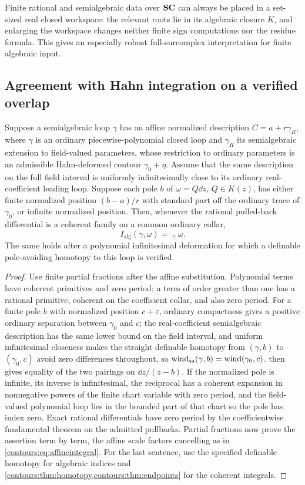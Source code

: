 \documentclass[11pt,letterpaper]{article}
\theoremstyle{definition}
\theoremstyle{remark}
\newcommand{\HInt}{\mathop{\int^{\!H}}\nolimits}
\numberwithin{equation}{section}
\begin{document}
Finite rational and semialgebraic data over $\mathbf{SC}$ can always be placed in a
set-sized real closed workspace: the relevant roots lie in its algebraic closure
$K$, and enlarging the workspace changes neither finite sign computations nor the
residue formula. This gives an especially robust full-surcomplex interpretation for
finite algebraic input.

\subsection{Agreement with Hahn integration on a verified overlap}
\label{contours:subsec:notconflated}
\begin{proposition}
\label{contours:prop:comparison}
Suppose a semialgebraic loop $\gamma$ has an affine normalized description
$C=a+r\gamma_R$, where $\gamma$ is an ordinary piecewise-polynomial closed loop and
$\gamma_R$ its semialgebraic extension to field-valued parameters, whose restriction
to ordinary parameters is an admissible Hahn-deformed contour $\gamma_0+\eta$.
Assume that the same description on the full field interval is uniformly
infinitesimally close to its ordinary real-coefficient leading loop. Suppose each
pole $b$ of $\omega=Q\dd z$, $Q\in K(z)$, has either finite normalized position
$(b-a)/r$ with standard part off the ordinary trace of $\gamma_0$, or infinite
normalized position. Then, whenever the rational pulled-back differential is a
coherent family on a common ordinary collar,
\[
  I_{\mathrm{alg}}(\gamma,\omega)=\HInt_\gamma\omega .
\]
The same holds after a polynomial infinitesimal deformation for which a definable
pole-avoiding homotopy to this loop is verified.
\end{proposition}
\begin{proof}
Use finite partial fractions after the affine substitution. Polynomial terms have
coherent primitives and zero period; a term of order greater than one has a rational
primitive, coherent on the coefficient collar, and also zero period. For a finite
pole $b$ with normalized position $c+\varepsilon$, ordinary compactness gives a
positive ordinary separation between $\gamma_0$ and $c$; the real-coefficient
semialgebraic description has the same lower bound on the field interval, and
uniform infinitesimal closeness makes the straight definable homotopy from
$(\gamma,b)$ to $(\gamma_0,c)$ avoid zero differences throughout, so
$\operatorname{wind}_{\mathrm{sa}}(\gamma,b)=\operatorname{wind}(\gamma_0,c)$.  then
gives equality of the two pairings on $\dd z/(z-b)$. If the normalized pole is
infinite, its inverse is infinitesimal, the reciprocal has a coherent expansion in
nonnegative powers of the finite chart variable with zero period, and the
field-valued polynomial loop lies in the bounded part of that chart so the pole has
index zero. Exact rational differentials have zero period by the coefficientwise
fundamental theorem on the admitted pullbacks. Partial fractions now prove the
assertion term by term, the affine scale factors cancelling as in
\eqref{contours:eq:affineintegral}. For the last sentence, use the specified
definable homotopy for algebraic indices and
\cref{contours:thm:homotopy,contours:thm:endpoints} for the coherent integrals.
\end{proof}
\end{document}
